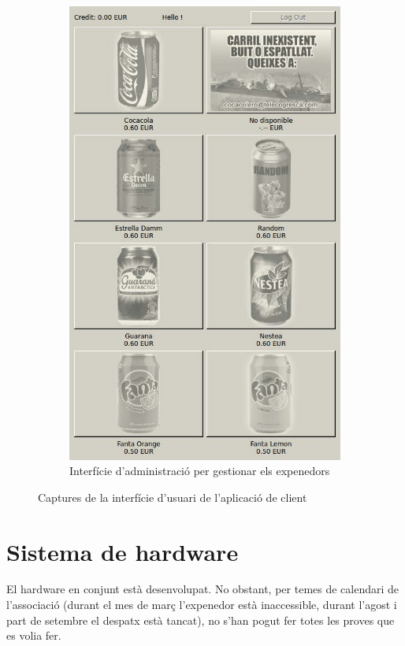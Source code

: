 \begin{figure}[H]
\begin{subfigure}[b]{0.45\textwidth}
		\includegraphics[width=\textwidth]{images/client_app2}
		\caption{Interfície d'administració per gestionar els expenedors}
		\label{fig:client-app2}
	\end{subfigure}
	\caption{Captures de la interfície d'usuari de l'aplicació de client}
	\label{fig:client-captures}
	\vspace{-1em}
\end{figure}
\newpage
\section{Sistema de hardware}
El hardware en conjunt està desenvolupat. No obstant, per temes de calendari de l'associació (durant el mes de març l'expenedor està inaccessible, durant l'agost i part de setembre el despatx està tancat), no s'han pogut fer totes les proves que es volia fer.

